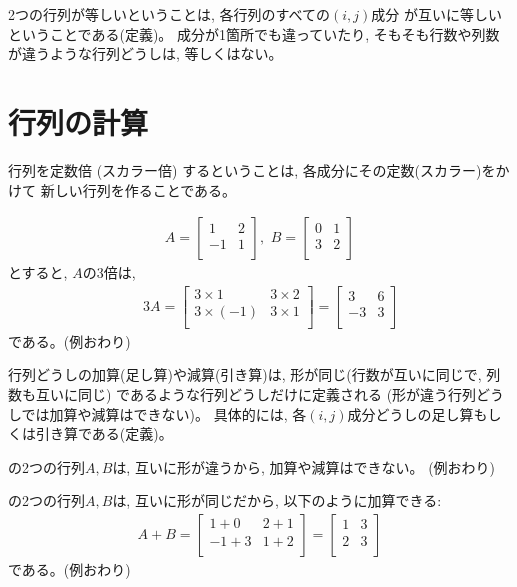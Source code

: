 2つの行列が等しいということは, 各行列のすべての$(i, j)$成分
が互いに等しいということである(定義)。
成分が1箇所でも違っていたり, そもそも行数や列数が違うような行列どうしは, 等しくはない。\\

\section{行列の計算}

行列を定数倍 (スカラー倍) するということは, 各成分にその定数(スカラー)をかけて
新しい行列を作ることである。

\begin{exmpl}
\begin{eqnarray}
A=\begin{bmatrix}
1 & 2 \\
-1 & 1 \\
\end{bmatrix}
,\,\,
B=\begin{bmatrix}
0 & 1 \\
3 & 2 \\
\end{bmatrix}\label{eq:matrix_exmpl00}
\end{eqnarray}
とすると, $A$の3倍は, 
\begin{eqnarray}
&&3A=\begin{bmatrix}
3\times1 & 3\times2 \\
3\times(-1) & 3\times1 \\
\end{bmatrix}=
\begin{bmatrix}
3 & 6 \\
-3 & 3\\
\end{bmatrix}
\end{eqnarray}
である。(例おわり)\end{exmpl}

行列どうしの加算(足し算)や減算(引き算)は, 形が同じ(行数が互いに同じで, 列数も互いに同じ)
であるような行列どうしだけに定義される (形が違う行列どうしでは加算や減算はできない)。
具体的には, 各$(i, j)$成分どうしの足し算もしくは引き算である(定義)。

\begin{exmpl}
の2つの行列$A, B$は, 互いに形が違うから, 加算や減算はできない。
(例おわり)\end{exmpl}

\begin{exmpl}
の2つの行列$A, B$は, 互いに形が同じだから, 以下のように加算できる:
\begin{eqnarray}
A+B=\begin{bmatrix}
1+0 & 2+1 \\
-1+3 & 1+2 \\
\end{bmatrix}
=\begin{bmatrix}
1 & 3 \\
2 & 3 \\
\end{bmatrix}
\end{eqnarray}
である。(例おわり)\end{exmpl}

